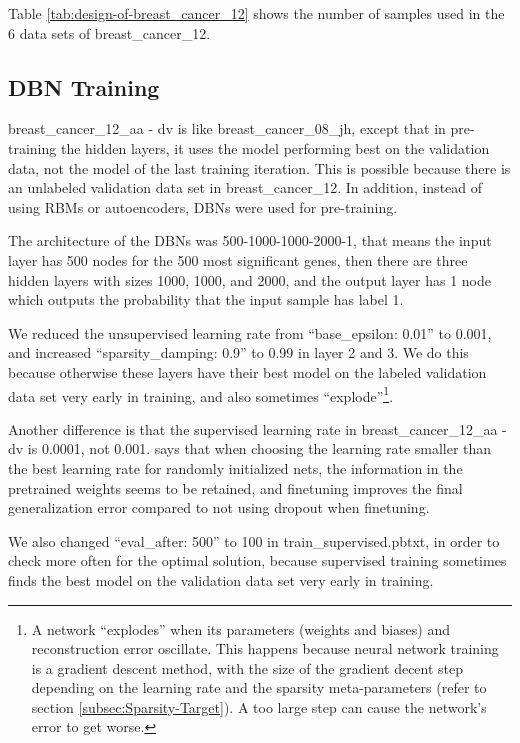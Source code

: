 Table \ref{tab:design-of-breast_cancer_12} shows the number of samples
used in the 6 data sets of breast\_cancer\_12.

\subsection{DBN Training}

breast\_cancer\_12\_aa - dv is like breast\_cancer\_08\_jh, except
that in pre-training the hidden layers, it uses the model performing
best on the validation data, not the model of the last training iteration.
This is possible because there is an unlabeled validation data set
in breast\_cancer\_12. In addition, instead of using RBMs or autoencoders,
DBNs were used for pre-training.

The architecture of the DBNs was 500-1000-1000-2000-1, that means
the input layer has 500 nodes for the 500 most significant genes,
then there are three hidden layers with sizes 1000, 1000, and 2000,
and the output layer has 1 node which outputs the probability that
the input sample has label 1.

We reduced the unsupervised learning rate from ``base\_epsilon: 0.01''
to 0.001, and increased ``sparsity\_damping: 0.9'' to 0.99 in layer
2 and 3. We do this because otherwise these layers have their best
model on the labeled validation data set very early in training, and
also sometimes ``explode''\footnote{A network ``explodes'' when its parameters (weights and biases)
and reconstruction error oscillate. This happens because neural network
training is a gradient descent method, with the size of the gradient
decent step depending on the learning rate and the sparsity meta-parameters
(refer to section \ref{subsec:Sparsity-Target}). A too large step
can cause the network's error to get worse.}.

Another difference is that the supervised learning rate in breast\_cancer\_12\_aa
- dv is 0.0001, not 0.001. \cite{SrivastavaSalakhutdinov2014} says
that when choosing the learning rate smaller than the best learning
rate for randomly initialized nets, the information in the pretrained
weights seems to be retained, and finetuning improves the final generalization
error compared to not using dropout when finetuning.

We also changed ``eval\_after: 500'' to 100 in train\_supervised.pbtxt,
in order to check more often for the optimal solution, because supervised
training sometimes finds the best model on the validation data set
very early in training.

